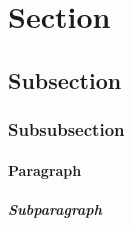 \section{Section}
\lipsum[1-1]
\subsection{Subsection}
\lipsum[1-1]
\subsubsection{Subsubsection}
\lipsum[1-1]
\paragraph{Paragraph}
\lipsum[1-1]
\subparagraph{Subparagraph}
\lipsum[1-1]